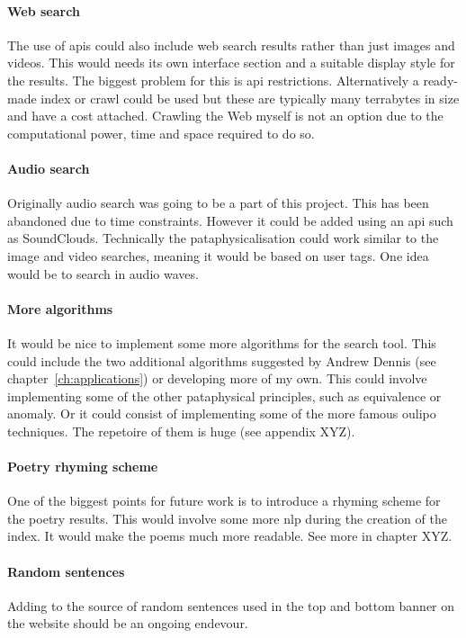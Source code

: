 \paragraph{Web search} 
The use of \gls{api}s could also include web search results rather than just images and videos. This would needs its own interface section and a suitable display style for the results. The biggest problem for this is \gls{api} restrictions. Alternatively a ready-made index or crawl could be used but these are typically many terrabytes in size and have a cost attached. Crawling the Web myself is not an option due to the computational power, time and space required to do so.

\paragraph{Audio search} 
Originally audio search was going to be a part of this project. This has been abandoned due to time constraints. However it could be added using an \gls{api} such as SoundClouds. Technically the pataphysicalisation could work similar to the image and video searches, meaning it would be based on user tags. One idea would be to search in audio waves.

\paragraph{More algorithms} 
It would be nice to implement some more algorithms for the search tool. This could include the two additional algorithms suggested by Andrew Dennis (see chapter~\ref{ch:applications}) or developing more of my own. This could involve implementing some of the other pataphysical principles, such as equivalence or anomaly. Or it could consist of implementing some of the more famous \gls{oulipo} techniques. The repetoire of them is huge (see appendix XYZ).

\paragraph{Poetry rhyming scheme} 
One of the biggest points for future work is to introduce a rhyming scheme for the poetry results. This would involve some more \gls{nlp} during the creation of the index. It would make the poems much more readable. See more in chapter XYZ.

\paragraph{Random sentences} 
Adding to the source of random sentences used in the top and bottom banner on the website should be an ongoing endevour.

